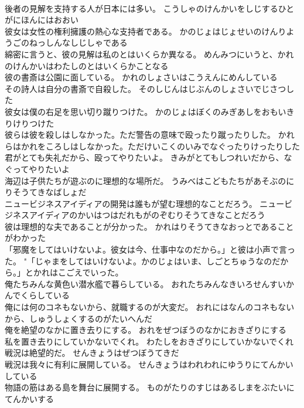 \documentclass[8pt]{extreport}
\begin{document}
\begin{CJK}{UTF8}{min}
\\	後者の見解を支持する人が日本には多い。	こうしゃのけんかいをしじするひとがにほんにはおおい 
\\	彼女は女性の権利擁護の熱心な支持者である。	かのじょはじょせいのけんりようごのねっしんなしじしゃである 
\\	綿密に言うと、彼の見解は私のとはいくらか異なる。	めんみつにいうと、かれのけんかいはわたしのとはいくらかことなる 
\\	彼の書斎は公園に面している。	かれのしょさいはこうえんにめんしている 
\\	その詩人は自分の書斎で自殺した。	そのしじんはじぶんのしょさいでじさつした 
\\	彼女は僕の右足を思い切り蹴りつけた。	かのじょはぼくのみぎあしをおもいきりけりつけた 
\\	彼らは彼を殺しはしなかった。ただ警告の意味で殴ったり蹴ったりした。	かれらはかれをころしはしなかった。ただけいこくのいみでなぐったりけったりした 
\\	君がとても失礼だから、殴ってやりたいよ。	きみがとてもしつれいだから、なぐってやりたいよ 
\\	海辺は子供たちが遊ぶのに理想的な場所だ。	うみべはこどもたちがあそぶのにりそうてきなばしょだ 
\\	ニュービジネスアイディアの開発は誰もが望む理想的なことだろう。	ニュービジネスアイディアのかいはつはだれもがのぞむりそうてきなことだろう 
\\	彼は理想的な夫であることが分かった。	かれはりそうてきなおっとであることがわかった 
\\	「邪魔をしてはいけないよ。彼女は今、仕事中なのだから。」と彼は小声で言った。	"「じゃまをしてはいけないよ。かのじょはいま、しごとちゅうなのだから。」とかれはこごえでいった。 
\\	俺たちみんな黄色い潜水艦で暮らしている。	おれたちみんなきいろせんすいかんでくらしている 
\\	俺には何のコネもないから、就職するのが大変だ。	おれにはなんのコネもないから、しゅうしょくするのがたいへんだ 
\\	俺を絶望のなかに置き去りにする。	おれをぜつぼうのなかにおきざりにする 
\\	私を置き去りにしていかないでくれ。	わたしをおきざりにしていかないでくれ 
\\	戦況は絶望的だ。	せんきょうはぜつぼうてきだ 
\\	戦況は我々に有利に展開している。	せんきょうはわれわれにゆうりにてんかいしている 
\\	物語の筋はある島を舞台に展開する。	ものがたりのすじはあるしまをぶたいにてんかいする 

\end{CJK}
\end{document}
